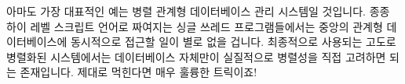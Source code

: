 아마도 가장 대표적인 예는 병렬 관계형 데이터베이스 관리 시스템일 것입니다.
종종 하이 레벨 스크립트 언어로 짜여지는 싱글 쓰레드 프로그램들에서는 중앙의
관계형 데이터베이스에 동시적으로 접근할 일이 별로 없을 겁니다.
최종적으로 사용되는 고도로 병렬화된 시스템에서는 데이터베이스 자체만이
실질적으로 병렬성을 직접 고려하면 되는 존재입니다.
제대로 먹힌다면 매우 훌륭한 트릭이죠!

\iffalse
Perhaps the most common example is the parallel relational database
management system.
It is not unusual for single-threaded programs, often written in
high-level scripting languages, to access a central relational
database concurrently.
In the resulting highly parallel system, only the database need actually
deal directly with parallelism.
A very nice trick when it works!
\fi
